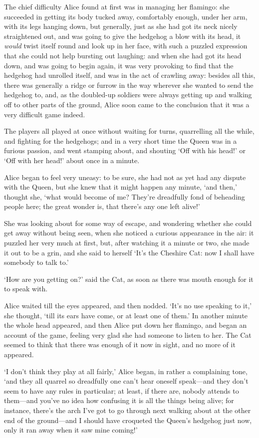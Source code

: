 \documentclass[12pt,openany]{memoir}
\begin{document}
The chief difficulty Alice found at first was in managing her flamingo: she succeeded in getting its body tucked away, comfortably enough, under her arm, with its legs hanging down, but generally, just as she had got its neck nicely straightened out, and was going to give the hedgehog a blow with its head, it \textit{would} twist itself round and look up in her face, with such a puzzled expression that she could not help bursting out laughing: and when she had got its head down, and was going to begin again, it was very provoking to find that the hedgehog had unrolled itself, and was in the act of crawling away: besides all this, there was generally a ridge or furrow in the way wherever she wanted to send the hedgehog to, and, as the doubled-up soldiers were always getting up and walking off to other parts of the ground, Alice soon came to the conclusion that it was a very difficult game indeed.

The players all played at once without waiting for turns, quarrelling all the while, and fighting for the hedgehogs; and in a very short time the Queen was in a furious passion, and went stamping about, and shouting `Off with his head!' or `Off with her head!' about once in a minute.

Alice began to feel very uneasy: to be sure, she had not as yet had any dispute with the Queen, but she knew that it might happen any minute, `and then,' thought she, `what would become of me? They're dreadfully fond of beheading people here; the great wonder is, that there's any one left alive!'

She was looking about for some way of escape, and wondering whether she could get away without being seen, when she noticed a curious appearance in the air: it puzzled her very much at first, but, after watching it a minute or two, she made it out to be a grin, and she said to herself `It's the Cheshire Cat: now I shall have somebody to talk to.'

`How are you getting on?' said the Cat, as soon as there was mouth enough for it to speak with.

Alice waited till the eyes appeared, and then nodded. `It's no use speaking to it,' she thought, `till its ears have come, or at least one of them.' In another minute the whole head appeared, and then Alice put down her flamingo, and began an account of the game, feeling very glad she had someone to listen to her. The Cat seemed to think that there was enough of it now in sight, and no more of it appeared.

`I don't think they play at all fairly,' Alice began, in rather a complaining tone, `and they all quarrel so dreadfully one can't hear oneself speak---and they don't seem to have any rules in particular; at least, if there are, nobody attends to them---and you've no idea how confusing it is all the things being alive; for instance, there's the arch I've got to go through next walking about at the other end of the ground---and I should have croqueted the Queen's hedgehog just now, only it ran away when it saw mine coming!'
\end{document}
